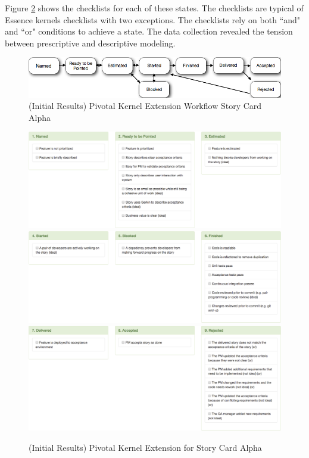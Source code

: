 \documentclass[preprint,12pt,3p]{elsarticle}
\begin{document}
Figure \ref{KernelExtension} shows the checklists for each of these states. The checklists are typical of Essence kernels checklists with two exceptions. The checklists rely on both ``and" and  ``or" conditions to achieve a state. The data collection revealed the tension between prescriptive and descriptive modeling.

\begin{figure}[ht]
\includegraphics[width=6.25in]{pivotal_images/story_card_workflow}
\caption{(Initial Results) Pivotal Kernel Extension Workflow Story Card Alpha}
\label{KernelExtensionWorkflow}
\end{figure}

\begin{figure}[ht]
\includegraphics[width=6.25in]{pivotal_images/story_card1}
\includegraphics[width=6.25in]{pivotal_images/story_card2}
\includegraphics[width=6.25in]{pivotal_images/story_card3}
\caption{(Initial Results) Pivotal Kernel Extension for Story Card Alpha}
\label{KernelExtension}
\end{figure}
\end{document}
